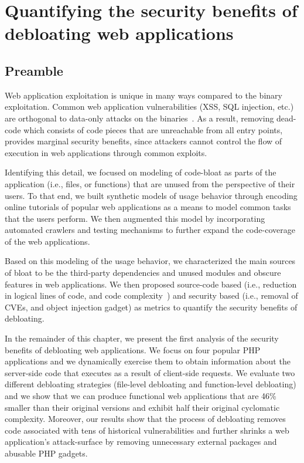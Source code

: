\chapter{Quantifying the security benefits of debloating web applications}
\label{chap:lim}

\section*{Preamble}
Web application exploitation is unique in many ways compared to the binary exploitation. 
Common web application vulnerabilities (XSS, SQL injection, etc.) are orthogonal to data-only attacks on the binaries~\cite{ispoglou2018block}. 
As a result, removing dead-code which consists of code pieces that are unreachable from all entry points, provides marginal security benefits, since attackers cannot control the flow of execution in web applications through common exploits. 

Identifying this detail, we focused on modeling of code-bloat as parts of the application (i.e., files, or functions) that are unused from the perspective of their users. 
To that end, we built synthetic models of usage behavior through encoding online tutorials of popular web applications as a means to model common tasks that the users perform. 
We then augmented this model by incorporating automated crawlers and testing mechanisms to further expand the code-coverage of the web applications. 

Based on this modeling of the usage behavior, we characterized the main sources of bloat to be the third-party dependencies and unused modules and obscure features in web applications. 
We then proposed source-code based (i.e., reduction in logical lines of code, and code complexity~\cite{gill1991cyclomatic}) and security based (i.e., removal of CVEs, and object injection gadget) as metrics to quantify the security benefits of debloating. 

In the remainder of this chapter, we present the first analysis of the security benefits of debloating web applications. 
We focus on four popular PHP applications and
we dynamically exercise them to obtain information about the server-side code
that executes as a result of client-side requests. We evaluate two different
debloating strategies (file-level debloating and function-level debloating)
and we show that we can produce functional web applications that are 46\%
smaller than their original versions and exhibit half their original cyclomatic
complexity. Moreover, our results show that the process of debloating removes
code associated with tens of historical vulnerabilities and further shrinks
a web application's attack-surface by removing unnecessary external packages
and abusable PHP gadgets.

